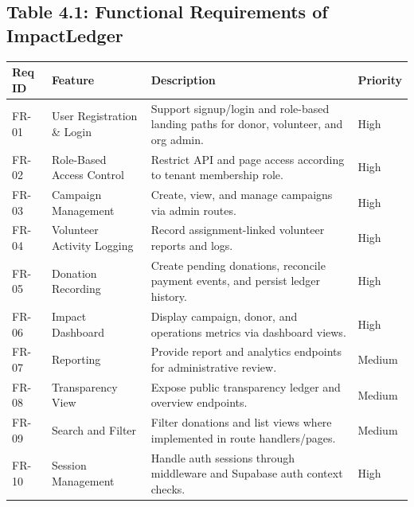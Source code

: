\documentclass[12pt,a4paper]{article}
\begin{document}
\subsection{Table 4.1: Functional Requirements of ImpactLedger}
\begin{longtable}{p{}p{}p{}p{}}
	\toprule
	Req ID & Feature                    & Description                                                                            & Priority \\
	\midrule
	FR-01  & User Registration \& Login & Support signup/login and role-based landing paths for donor, volunteer, and org admin. & High     \\
	FR-02  & Role-Based Access Control  & Restrict API and page access according to tenant membership role.                      & High     \\
	FR-03  & Campaign Management        & Create, view, and manage campaigns via admin routes.                                   & High     \\
	FR-04  & Volunteer Activity Logging & Record assignment-linked volunteer reports and logs.                                   & High     \\
	FR-05  & Donation Recording         & Create pending donations, reconcile payment events, and persist ledger history.        & High     \\
	FR-06  & Impact Dashboard           & Display campaign, donor, and operations metrics via dashboard views.                   & High     \\
	FR-07  & Reporting                  & Provide report and analytics endpoints for administrative review.                      & Medium   \\
	FR-08  & Transparency View          & Expose public transparency ledger and overview endpoints.                              & Medium   \\
	FR-09  & Search and Filter          & Filter donations and list views where implemented in route handlers/pages.             & Medium   \\
	FR-10  & Session Management         & Handle auth sessions through middleware and Supabase auth context checks.              & High     \\
	\bottomrule
\end{longtable}

\newpage
\end{document}
